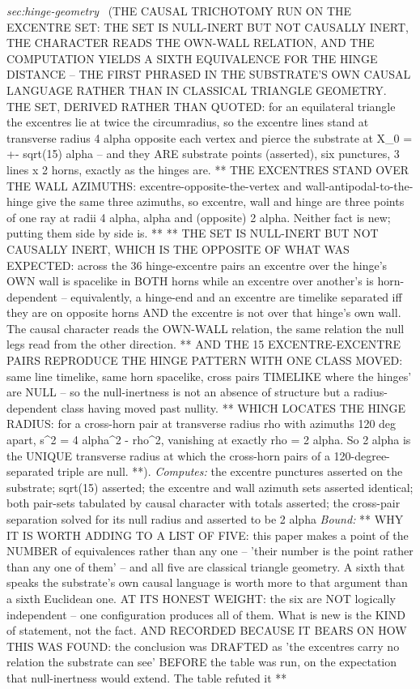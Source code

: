 \begin{description}
\textit{sec:hinge-geometry} \ (THE CAUSAL TRICHOTOMY RUN ON THE EXCENTRE SET: THE SET IS NULL-INERT BUT NOT CAUSALLY INERT, THE CHARACTER READS THE OWN-WALL RELATION, AND THE COMPUTATION YIELDS A SIXTH EQUIVALENCE FOR THE HINGE DISTANCE -- THE FIRST PHRASED IN THE SUBSTRATE'S OWN CAUSAL LANGUAGE RATHER THAN IN CLASSICAL TRIANGLE GEOMETRY. THE SET, DERIVED RATHER THAN QUOTED: for an equilateral triangle the excentres lie at twice the circumradius, so the excentre lines stand at transverse radius 4 alpha opposite each vertex and pierce the substrate at X\_0 = +- sqrt(15) alpha -- and they ARE substrate points (asserted), six punctures, 3 lines x 2 horns, exactly as the hinges are. ** THE EXCENTRES STAND OVER THE WALL AZIMUTHS: excentre-opposite-the-vertex and wall-antipodal-to-the-hinge give the same three azimuths, so excentre, wall and hinge are three points of one ray at radii 4 alpha, alpha and (opposite) 2 alpha. Neither fact is new; putting them side by side is. ** ** THE SET IS NULL-INERT BUT NOT CAUSALLY INERT, WHICH IS THE OPPOSITE OF WHAT WAS EXPECTED: across the 36 hinge-excentre pairs an excentre over the hinge's OWN wall is spacelike in BOTH horns while an excentre over another's is horn-dependent -- equivalently, a hinge-end and an excentre are timelike separated iff they are on opposite horns AND the excentre is not over that hinge's own wall. The causal character reads the OWN-WALL relation, the same relation the null legs read from the other direction. ** AND THE 15 EXCENTRE-EXCENTRE PAIRS REPRODUCE THE HINGE PATTERN WITH ONE CLASS MOVED: same line timelike, same horn spacelike, cross pairs TIMELIKE where the hinges' are NULL -- so the null-inertness is not an absence of structure but a radius-dependent class having moved past nullity. ** WHICH LOCATES THE HINGE RADIUS: for a cross-horn pair at transverse radius rho with azimuths 120 deg apart, s\textasciicircum{}2 = 4 alpha\textasciicircum{}2 - rho\textasciicircum{}2, vanishing at exactly rho = 2 alpha. So 2 alpha is the UNIQUE transverse radius at which the cross-horn pairs of a 120-degree-separated triple are null. **). 
\emph{Computes:} the excentre punctures asserted on the substrate; sqrt(15) asserted; the excentre and wall azimuth sets asserted identical; both pair-sets tabulated by causal character with totals asserted; the cross-pair separation solved for its null radius and asserted to be 2 alpha
 \emph{Bound:} ** WHY IT IS WORTH ADDING TO A LIST OF FIVE: this paper makes a point of the NUMBER of equivalences rather than any one -- 'their number is the point rather than any one of them' -- and all five are classical triangle geometry. A sixth that speaks the substrate's own causal language is worth more to that argument than a sixth Euclidean one. AT ITS HONEST WEIGHT: the six are NOT logically independent -- one configuration produces all of them. What is new is the KIND of statement, not the fact. AND RECORDED BECAUSE IT BEARS ON HOW THIS WAS FOUND: the conclusion was DRAFTED as 'the excentres carry no relation the substrate can see' BEFORE the table was run, on the expectation that null-inertness would extend. The table refuted it **

\end{description}

